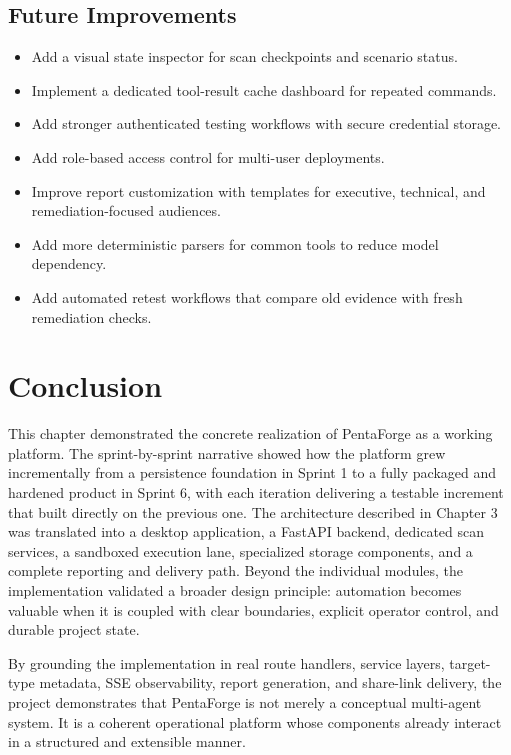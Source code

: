 \documentclass[12pt,a4paper]{report}
\begin{document}
\subsection{Future Improvements}

\begin{itemize}
    \item Add a visual state inspector for scan checkpoints and scenario status.
    \item Implement a dedicated tool-result cache dashboard for repeated commands.
    \item Add stronger authenticated testing workflows with secure credential
    storage.
    \item Add role-based access control for multi-user deployments.
    \item Improve report customization with templates for executive, technical, and
    remediation-focused audiences.
    \item Add more deterministic parsers for common tools to reduce model dependency.
    \item Add automated retest workflows that compare old evidence with fresh
    remediation checks.
\end{itemize}

\section{Conclusion}

This chapter demonstrated the concrete realization of PentaForge as a working
platform. The sprint-by-sprint narrative showed how the platform grew incrementally
from a persistence foundation in Sprint 1 to a fully packaged and hardened product
in Sprint 6, with each iteration delivering a testable increment that built directly
on the previous one. The architecture described in Chapter 3 was translated into a
desktop application, a FastAPI backend, dedicated scan services, a sandboxed
execution lane, specialized storage components, and a complete reporting and delivery
path. Beyond the individual modules, the implementation validated a broader design
principle: automation becomes valuable when it is coupled with clear boundaries,
explicit operator control, and durable project state.

By grounding the implementation in real route handlers, service layers, target-type
metadata, SSE observability, report generation, and share-link delivery, the project
demonstrates that PentaForge is not merely a conceptual multi-agent system. It is a
coherent operational platform whose components already interact in a structured and
extensible manner.
\end{document}
